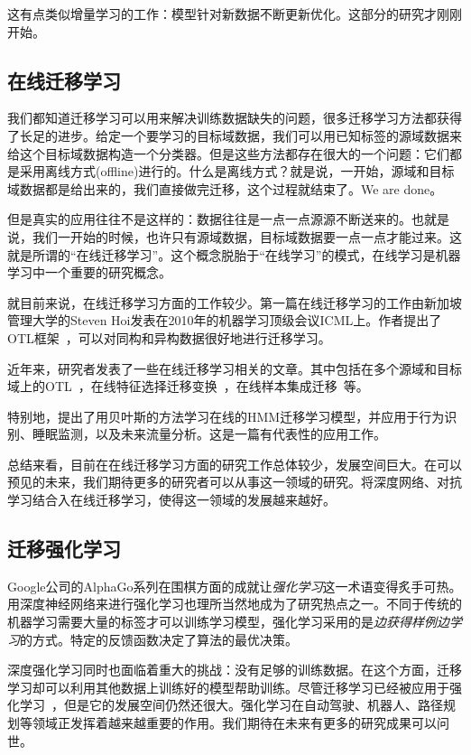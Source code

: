 这有点类似增量学习的工作：模型针对新数据不断更新优化。这部分的研究才刚刚开始。

\subsection{在线迁移学习}

我们都知道迁移学习可以用来解决训练数据缺失的问题，很多迁移学习方法都获得了长足的进步。给定一个要学习的目标域数据，我们可以用已知标签的源域数据来给这个目标域数据构造一个分类器。但是这些方法都存在很大的一个问题：它们都是采用离线方式(offline)进行的。什么是离线方式？就是说，一开始，源域和目标域数据都是给出来的，我们直接做完迁移，这个过程就结束了。We are done。

但是真实的应用往往不是这样的：数据往往是一点一点源源不断送来的。也就是说，我们一开始的时候，也许只有源域数据，目标域数据要一点一点才能过来。这就是所谓的“在线迁移学习”。这个概念脱胎于“在线学习”的模式，在线学习是机器学习中一个重要的研究概念。

就目前来说，在线迁移学习方面的工作较少。第一篇在线迁移学习的工作由新加坡管理大学的Steven Hoi发表在2010年的机器学习顶级会议ICML上。作者提出了OTL框架~\cite{zhao2010otl}，可以对同构和异构数据很好地进行迁移学习。

近年来，研究者发表了一些在线迁移学习相关的文章。其中包括在多个源域和目标域上的OTL~\cite{wu2017online,yan2017online}，在线特征选择迁移变换~\cite{wang2014online,zhang2017online}，在线样本集成迁移~\cite{gao2012online,patilknowledge}等。

特别地，\cite{jaini2016online}提出了用贝叶斯的方法学习在线的HMM迁移学习模型，并应用于行为识别、睡眠监测，以及未来流量分析。这是一篇有代表性的应用工作。

总结来看，目前在在线迁移学习方面的研究工作总体较少，发展空间巨大。在可以预见的未来，我们期待更多的研究者可以从事这一领域的研究。将深度网络、对抗学习结合入在线迁移学习，使得这一领域的发展越来越好。

\subsection{迁移强化学习}

Google公司的AlphaGo系列在围棋方面的成就让\textit{强化学习}这一术语变得炙手可热。用深度神经网络来进行强化学习也理所当然地成为了研究热点之一。不同于传统的机器学习需要大量的标签才可以训练学习模型，强化学习采用的是\textit{边获得样例边学习}的方式。特定的反馈函数决定了算法的最优决策。

深度强化学习同时也面临着重大的挑战：没有足够的训练数据。在这个方面，迁移学习却可以利用其他数据上训练好的模型帮助训练。尽管迁移学习已经被应用于强化学习~\cite{taylor2009transfer}，但是它的发展空间仍然还很大。强化学习在自动驾驶、机器人、路径规划等领域正发挥着越来越重要的作用。我们期待在未来有更多的研究成果可以问世。

